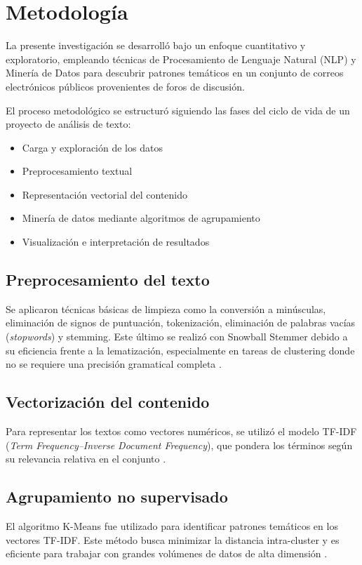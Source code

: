 \documentclass[journal]{IEEEtran}
\begin{document}
\section{Metodología}
La presente investigación se desarrolló bajo un enfoque cuantitativo y exploratorio, empleando técnicas de Procesamiento de Lenguaje Natural (NLP) y Minería de Datos para descubrir patrones temáticos en un conjunto de correos electrónicos públicos provenientes de foros de discusión.

El proceso metodológico se estructuró siguiendo las fases del ciclo de vida de un proyecto de análisis de texto:
\begin{itemize}
    \item Carga y exploración de los datos
    \item Preprocesamiento textual
    \item Representación vectorial del contenido
    \item Minería de datos mediante algoritmos de agrupamiento
    \item Visualización e interpretación de resultados
\end{itemize}

\subsection{Preprocesamiento del texto}
Se aplicaron técnicas básicas de limpieza como la conversión a minúsculas, eliminación de signos de puntuación, tokenización, eliminación de palabras vacías (\textit{stopwords}) y stemming. Este último se realizó con Snowball Stemmer debido a su eficiencia frente a la lematización, especialmente en tareas de clustering donde no se requiere una precisión gramatical completa \cite{manning2008introduction}.

\subsection{Vectorización del contenido}
Para representar los textos como vectores numéricos, se utilizó el modelo TF-IDF (\textit{Term Frequency–Inverse Document Frequency}), que pondera los términos según su relevancia relativa en el conjunto \cite{ramos2003using}.

\subsection{Agrupamiento no supervisado}
El algoritmo K-Means fue utilizado para identificar patrones temáticos en los vectores TF-IDF. Este método busca minimizar la distancia intra-cluster y es eficiente para trabajar con grandes volúmenes de datos de alta dimensión \cite{lloyd1982least}.
\end{document}
